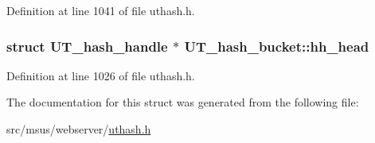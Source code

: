 Definition at line 1041 of file uthash.\-h.

\hypertarget{struct_u_t__hash__bucket_aff0ef60d2d1fabbfdd092b1ae9d00422}{
\subsubsection[{hh\-\_\-head}]{\setlength{\rightskip}{0pt plus 5cm}struct {\bf U\-T\-\_\-hash\-\_\-handle} $\ast$ U\-T\-\_\-hash\-\_\-bucket\-::hh\-\_\-head}}\label{struct_u_t__hash__bucket_aff0ef60d2d1fabbfdd092b1ae9d00422}


Definition at line 1026 of file uthash.\-h.



The documentation for this struct was generated from the following file\-:\begin{DoxyCompactItemize}
\item 
src/msus/webserver/\hyperlink{msus_2webserver_2uthash_8h}{uthash.\-h}\end{DoxyCompactItemize}
